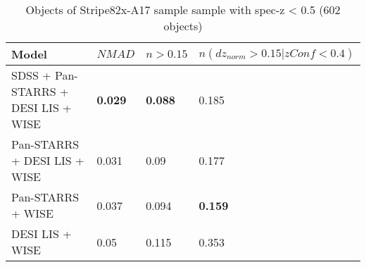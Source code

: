 \begin{table*}
	\begin{tabular}{llll}
            \hline
                                           Model &          $NMAD$ &        $n>0.15$ & $n(dz_{norm}>0.15 | zConf<0.4)$ \\
            \hline
             SDSS + Pan-STARRS + DESI LIS + WISE &  \textbf{0.029} &  \textbf{0.088} &                           0.185 \\
                    Pan-STARRS + DESI LIS + WISE &           0.031 &            0.09 &                           0.177 \\
                               Pan-STARRS + WISE &           0.037 &           0.094 &                  \textbf{0.159} \\
                                 DESI LIS + WISE &            0.05 &           0.115 &                           0.353 \\
            \hline
            \end{tabular}
            \caption{Objects of Stripe82x-A17 sample sample with spec-z < 0.5 (602 objects)}
\end{table*}